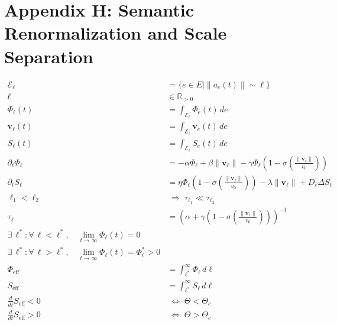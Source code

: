 \documentclass[11pt,oneside]{article}
\begin{document}
\section{Appendix H: Semantic Renormalization and Scale Separation}

\begin{align}
\mathcal{E}_\ell &= \{ e \in E \mid \|a_e(t)\| \sim \ell \} \\[6pt]
\ell &\in \mathbb{R}_{>0} \\[10pt]

\Phi_\ell(t)
&=
\int_{\mathcal{E}_\ell}
\Phi_e(t)\,de
\\[12pt]

\mathbf{v}_\ell(t)
&=
\int_{\mathcal{E}_\ell}
\mathbf{v}_e(t)\,de
\\[12pt]

S_\ell(t)
&=
\int_{\mathcal{E}_\ell}
S_e(t)\,de
\\[12pt]

\partial_t \Phi_\ell
&=
-\alpha \Phi_\ell
+ \beta \|\mathbf{v}_\ell\|
- \gamma \Phi_\ell
\left(
1 - \sigma\!\left(
\frac{\|\mathbf{v}_\ell\|}{v_0}
\right)
\right)
\\[12pt]

\partial_t S_\ell
&=
\eta \Phi_\ell
\left(
1 - \sigma\!\left(
\frac{\|\mathbf{v}_\ell\|}{v_0}
\right)
\right)
- \lambda \|\mathbf{v}_\ell\|
+ D_\ell \Delta S_\ell
\\[12pt]

\ell_1 < \ell_2
&\;\Longrightarrow\;
\tau_{\ell_1} \ll \tau_{\ell_2}
\\[10pt]

\tau_\ell
&=
\left(
\alpha +
\gamma\left(
1 - \sigma\!\left(
\frac{\|\mathbf{v}_\ell\|}{v_0}
\right)
\right)
\right)^{-1}
\\[14pt]

\exists\, \ell^\ast :
\forall\, \ell < \ell^\ast,
\quad
\lim_{t \to \infty} \Phi_\ell(t) = 0
\\[10pt]

\exists\, \ell^\ast :
\forall\, \ell > \ell^\ast,
\quad
\lim_{t \to \infty} \Phi_\ell(t) = \Phi_\ell^\ast > 0
\\[14pt]

\Phi_{\text{eff}}
&=
\int_{\ell^\ast}^{\infty}
\Phi_\ell \, d\ell
\\[12pt]

S_{\text{eff}}
&=
\int_{\ell^\ast}^{\infty}
S_\ell \, d\ell
\\[12pt]

\frac{d}{dt} S_{\text{eff}} < 0
&\;\Longleftrightarrow\;
\Theta < \Theta_c
\\[10pt]

\frac{d}{dt} S_{\text{eff}} > 0
&\;\Longleftrightarrow\;
\Theta > \Theta_c
\end{align}
\end{document}
